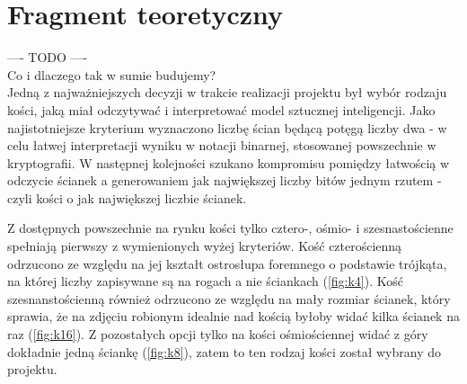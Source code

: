 \chapter{Fragment teoretyczny}

---- TODO ---- \\

Co i dlaczego tak w sumie budujemy? \\

Jedną z najważniejszych decyzji w trakcie realizacji projektu był wybór rodzaju kości, jaką miał odczytywać 
i interpretować model sztucznej inteligencji. Jako najistotniejsze kryterium wyznaczono liczbę ścian będącą 
potęgą liczby dwa - w celu łatwej interpretacji wyniku w notacji binarnej, stosowanej powszechnie w kryptografii.
W następnej kolejności szukano kompromisu pomiędzy łatwością w odczycie ścianek a generowaniem jak największej liczby
bitów jednym rzutem - czyli kości o jak największej liczbie ścianek. 
\par
Z dostępnych powszechnie na rynku kości tylko cztero-, ośmio- i szesnastościenne spełniają pierwszy z wymienionych
wyżej kryteriów. Kość czterościenną odrzucono ze względu na jej kształt ostrosłupa foremnego o podstawie trójkąta, 
na której liczby zapisywane są na rogach a nie ściankach (\ref{fig:k4}). Kość szesnanstościenną również odrzucono ze względu na
mały rozmiar ścianek, który sprawia, że na zdjęciu robionym idealnie nad kością byłoby widać kilka ścianek na raz (\ref{fig:k16}).
Z pozostałych opcji tylko na kości ośmiościennej widać z góry dokładnie jedną ściankę (\ref{fig:k8}), zatem to ten rodzaj kości
został wybrany do projektu.


